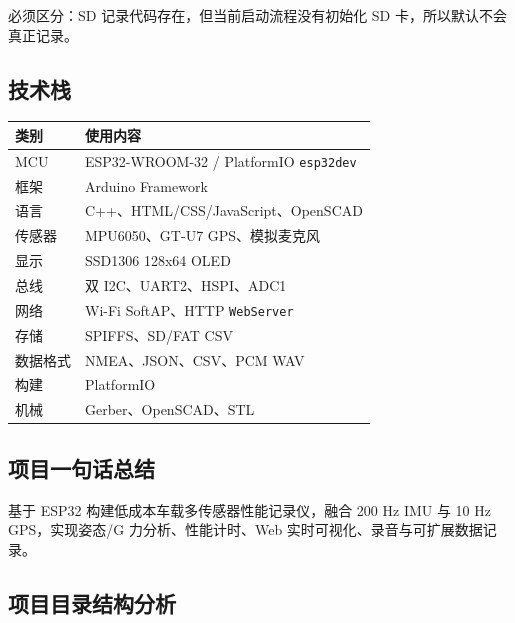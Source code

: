 \documentclass[
  UTF8,11pt,a4paper]{ctexart}
\newcommand{\passthrough}[1]{#1}
\newcounter{none} %
\begin{document}
必须区分：SD 记录代码存在，但当前启动流程没有初始化 SD
卡，所以默认不会真正记录。

\subsection{技术栈}\label{ux6280ux672fux6808}

{\def\LTcaptype{none} %
\begin{longtable}[]{@{}ll@{}}
\toprule\noalign{}
类别 & 使用内容 \\
\midrule\noalign{}
\endhead
\bottomrule\noalign{}
\endlastfoot
MCU & ESP32-WROOM-32 / PlatformIO \passthrough{\lstinline!esp32dev!} \\
框架 & Arduino Framework \\
语言 & C++、HTML/CSS/JavaScript、OpenSCAD \\
传感器 & MPU6050、GT-U7 GPS、模拟麦克风 \\
显示 & SSD1306 128x64 OLED \\
总线 & 双 I2C、UART2、HSPI、ADC1 \\
网络 & Wi-Fi SoftAP、HTTP \passthrough{\lstinline!WebServer!} \\
存储 & SPIFFS、SD/FAT CSV \\
数据格式 & NMEA、JSON、CSV、PCM WAV \\
构建 & PlatformIO \\
机械 & Gerber、OpenSCAD、STL \\
\end{longtable}
}

\subsection{项目一句话总结}\label{ux9879ux76eeux4e00ux53e5ux8bddux603bux7ed3}

基于 ESP32 构建低成本车载多传感器性能记录仪，融合 200 Hz IMU 与 10 Hz
GPS，实现姿态/G 力分析、性能计时、Web 实时可视化、录音与可扩展数据记录。

\subsection{项目目录结构分析}\label{ux9879ux76eeux76eeux5f55ux7ed3ux6784ux5206ux6790}
\end{document}
